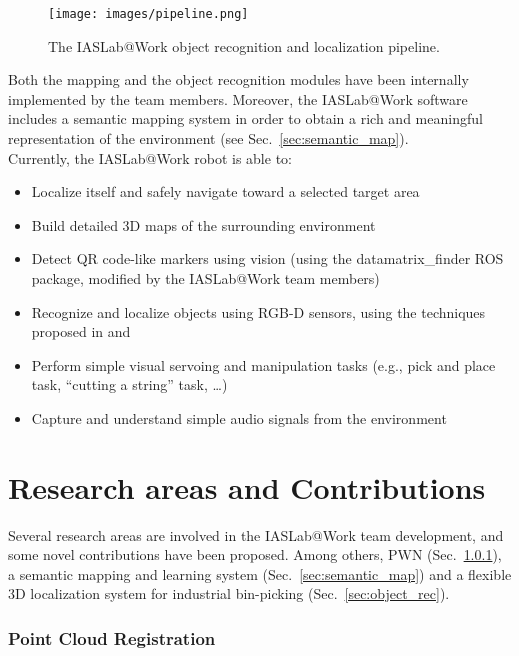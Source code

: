\documentclass[conference]{IEEEtran}
\begin{document}
\begin{figure*}[t!]
\begin{center}
\texttt{[image: images/pipeline.png]}
\end{center}
\caption{The IASLab@Work object recognition and localization pipeline.}\label{fig:pipeline}
\end{figure*}

Both the mapping and the object recognition modules have been internally implemented by the team members.
Moreover, the IASLab@Work software includes a semantic mapping system in order to obtain a rich and meaningful representation of the environment (see Sec.~\ref{sec:semantic_map}).\\

Currently, the IASLab@Work robot is able to:

\begin{itemize}
 \item Localize itself and safely navigate toward a selected target area
 \item Build detailed 3D maps of the surrounding environment
 \item Detect QR code-like markers using vision (using the datamatrix\_finder ROS package, modified by the IASLab@Work team members)
 \item Recognize and localize objects using RGB-D sensors, using the techniques proposed in \cite{antonelloVISIGRAPP2014} and \cite{prettoCASE2013}
 \item Perform simple visual servoing and manipulation tasks (e.g., pick and place task, ``cutting a string'' task, \dots)
 \item Capture and understand simple audio signals from the environment
\end{itemize}

 
\section{Research areas and Contributions}\label{sec:research}

Several research areas are involved in the IASLab@Work team development, and some novel contributions have been proposed. Among others, PWN (Sec.~\ref{sec:pwn}), a semantic mapping and learning system (Sec.~\ref{sec:semantic_map}) and a flexible 3D localization system for industrial bin-picking (Sec.~\ref{sec:object_rec}).

\subsubsection{Point Cloud Registration}\label{sec:pwn}
\end{document}
